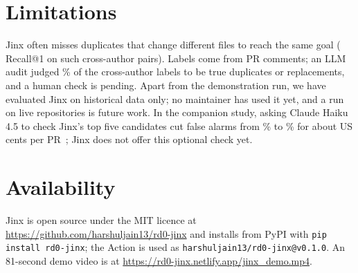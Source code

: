 \documentclass[sigconf]{acmart}
\begin{document}
\section{Limitations}
Jinx often misses duplicates that change different files to reach the same goal (\ROnejinxClassD{} Recall@1 on such cross-author pairs). Labels come from PR comments; an LLM audit judged \auditOpenStrict\% of the cross-author labels to be true duplicates or replacements, and a human check is pending. Apart from the demonstration run, we have evaluated Jinx on historical data only; no maintainer has used it yet, and a run on live repositories is future work. In the companion study, asking Claude Haiku 4.5 to check Jinx's top five candidates cut false alarms from \FARsubjinx\% to \FARsubhaiku\% for about \costHaikuPerPR{} US cents per PR~\cite{jinxstudy}; Jinx does not offer this optional check yet.

\section{Availability}
Jinx is open source under the MIT licence at \url{https://github.com/harshuljain13/rd0-jinx} and installs from PyPI with \texttt{pip install rd0-jinx}; the Action is used as \texttt{harshuljain13/rd0-jinx@v0.1.0}. An 81-second demo video is at \url{https://rd0-jinx.netlify.app/jinx_demo.mp4}.


\end{document}
